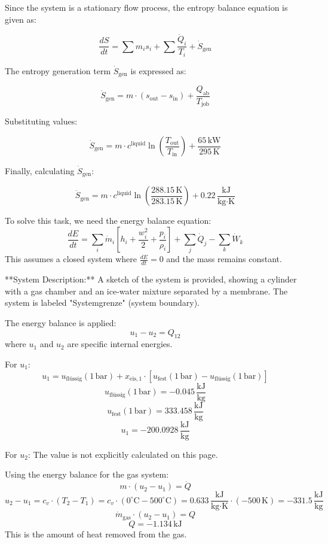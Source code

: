 Since the system is a stationary flow process, the entropy balance equation is given as:  

\[
\frac{dS}{dt} = \sum m_i s_i + \sum \frac{\dot{Q}_i}{T_i} + \dot{S}_{\text{gen}}
\]

The entropy generation term \( \dot{S}_{\text{gen}} \) is expressed as:  

\[
\dot{S}_{\text{gen}} = m \cdot (s_{\text{out}} - s_{\text{in}}) + \frac{Q_{\text{ab}}}{T_{\text{job}}}
\]

Substituting values:  

\[
\dot{S}_{\text{gen}} = m \cdot c^{\text{liquid}} \ln \left( \frac{T_{\text{out}}}{T_{\text{in}}} \right) + \frac{65 \, \text{kW}}{295 \, \text{K}}
\]

Finally, calculating \( \dot{S}_{\text{gen}} \):  

\[
\dot{S}_{\text{gen}} = m \cdot c^{\text{liquid}} \ln \left( \frac{288.15 \, \text{K}}{283.15 \, \text{K}} \right) + 0.22 \, \frac{\text{kJ}}{\text{kg·K}}
\]

To solve this task, we need the energy balance equation:  
\[
\frac{dE}{dt} = \sum_i \dot{m}_i \left[ h_i + \frac{w_i^2}{2} + \frac{p_i}{\rho_i} \right] + \sum_j \dot{Q}_j - \sum_k \dot{W}_k
\]  
This assumes a closed system where \( \frac{dE}{dt} = 0 \) and the mass remains constant.  

**System Description:**  
A sketch of the system is provided, showing a cylinder with a gas chamber and an ice-water mixture separated by a membrane. The system is labeled "Systemgrenze" (system boundary).  

The energy balance is applied:  
\[
u_1 - u_2 = Q_{12}
\]  
where \( u_1 \) and \( u_2 \) are specific internal energies.  

For \( u_1 \):  
\[
u_1 = u_{\text{flüssig}}(1 \, \text{bar}) + x_{\text{eis},1} \cdot \left[ u_{\text{fest}}(1 \, \text{bar}) - u_{\text{flüssig}}(1 \, \text{bar}) \right]
\]  
\[
u_{\text{flüssig}}(1 \, \text{bar}) = -0.045 \, \frac{\text{kJ}}{\text{kg}}
\]  
\[
u_{\text{fest}}(1 \, \text{bar}) = 333.458 \, \frac{\text{kJ}}{\text{kg}}
\]  
\[
u_1 = -200.0928 \, \frac{\text{kJ}}{\text{kg}}
\]  

For \( u_2 \):  
The value is not explicitly calculated on this page.  

Using the energy balance for the gas system:  
\[
m \cdot (u_2 - u_1) = \dot{Q}
\]  
\[
u_2 - u_1 = c_v \cdot (T_2 - T_1) = c_v \cdot (0^\circ\text{C} - 500^\circ\text{C}) = 0.633 \, \frac{\text{kJ}}{\text{kg·K}} \cdot (-500 \, \text{K}) = -331.5 \, \frac{\text{kJ}}{\text{kg}}
\]  
\[
\dot{m}_{\text{gas}} \cdot (u_2 - u_1) = Q
\]  
\[
Q = -1.134 \, \text{kJ}
\]  
This is the amount of heat removed from the gas.

